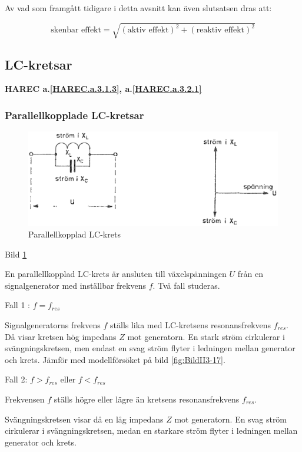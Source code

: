 Av vad som framgått tidigare i detta avsnitt kan även slutsatsen dras att:

\[
\text{skenbar effekt} = \sqrt{(\text{aktiv effekt})^2 + (\text{reaktiv effekt})^2}
\]

\subsection{LC-kretsar}
\textbf{HAREC
  a.\ref{HAREC.a.3.1.3}\label{myHAREC.a.3.1.3d},
  a.\ref{HAREC.a.3.2.1}\label{myHAREC.a.3.2.1}
}

\subsubsection{Parallellkopplade LC-kretsar}

\begin{figure}
\includegraphics[width=\textwidth]{images/cropped_pdfs/bild_2_3-15.pdf}
\caption{Parallellkopplad LC-krets}
\label{fig:BildII3-15}
\end{figure}

Bild \ref{fig:BildII3-15}

En parallellkopplad LC-krets är ansluten till växelspänningen \(U\) från en
signalgenerator med inställbar frekvens \(f\). Två fall studeras.

Fall 1 : \(f = f_{res}\)

Signalgeneratorns frekvens \(f\) ställs lika med LC-kretsens resonansfrekvens
\(f_{res}\). Då visar kretsen hög impedans \(Z\) mot generatorn. En stark ström
cirkulerar i svängningskretsen, men endast en svag ström flyter i ledningen
mellan generator och krets. Jämför med modellförsöket på bild \ref{fig:BildII3-17}.

Fall 2: \(f > f_{res}\) eller \(f < f_{res}\)

Frekvensen \(f\) ställs högre eller lägre än kretsens resonansfrekvens
\(f_{res}\).

Svängningskretsen visar då en låg impedans \(Z\) mot generatorn. En svag ström
cirkulerar i svängningskretsen, medan en starkare ström flyter i ledningen
mellan generator och krets.

